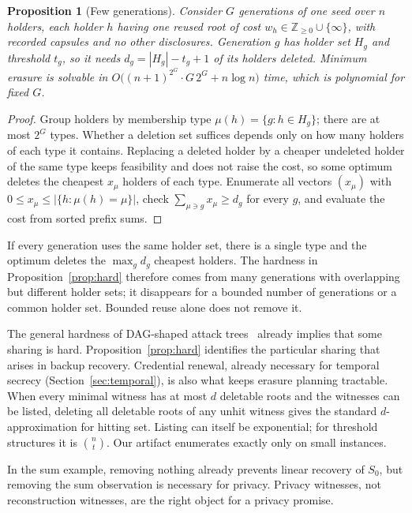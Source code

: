 \documentclass[pdflatex,sn-mathphys-num]{sn-jnl}
\theoremstyle{plain}
\newtheorem{proposition}[theorem]{Proposition}
\theoremstyle{definition}
\begin{document}
\begin{proposition}[Few generations]\label{prop:fewgen}
Consider $G$ generations of one seed over $n$ holders, each holder $h$ having one reused root of cost $w_h\in\mathbb{Z}_{\ge0}\cup\{\infty\}$, with recorded capsules and no other disclosures. Generation $g$ has holder set $H_g$ and threshold $t_g$, so it needs $d_g=|H_g|-t_g+1$ of its holders deleted. Minimum erasure is solvable in $O\big((n+1)^{2^G}\cdot G\,2^G+n\log n\big)$ time, which is polynomial for fixed $G$.
\end{proposition}
\begin{proof}
Group holders by membership type $\mu(h)=\{g:h\in H_g\}$; there are at most $2^G$ types. Whether a deletion set suffices depends only on how many holders of each type it contains. Replacing a deleted holder by a cheaper undeleted holder of the same type keeps feasibility and does not raise the cost, so some optimum deletes the cheapest $x_\mu$ holders of each type. Enumerate all vectors $(x_\mu)$ with $0\le x_\mu\le|\{h:\mu(h)=\mu\}|$, check $\sum_{\mu\ni g}x_\mu\ge d_g$ for every $g$, and evaluate the cost from sorted prefix sums.
\end{proof}

If every generation uses the same holder set, there is a single type and the optimum deletes the $\max_gd_g$ cheapest holders. The hardness in Proposition~\ref{prop:hard} therefore comes from many generations with overlapping but different holder sets; it disappears for a bounded number of generations or a common holder set. Bounded reuse alone does not remove it.

The general hardness of DAG-shaped attack trees~\cite{lopuhaa2022} already implies that some sharing is hard. Proposition~\ref{prop:hard} identifies the particular sharing that arises in backup recovery. Credential renewal, already necessary for temporal secrecy (Section~\ref{sec:temporal}), is also what keeps erasure planning tractable. When every minimal witness has at most $d$ deletable roots and the witnesses can be listed, deleting all deletable roots of any unhit witness gives the standard $d$-approximation for hitting set. Listing can itself be exponential; for threshold structures it is $\binom{n}{t}$. Our artifact enumerates exactly only on small instances.

In the sum example, removing nothing already prevents linear recovery of $S_0$, but removing the sum observation is necessary for privacy. Privacy witnesses, not reconstruction witnesses, are the right object for a privacy promise.
\end{document}
